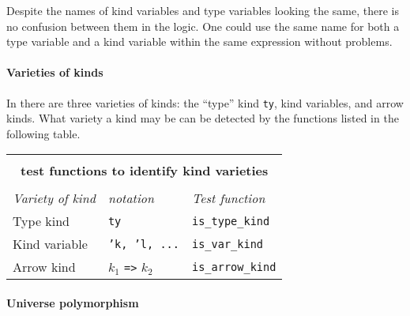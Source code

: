Despite the names of kind variables and type variables looking the same,
there is no confusion between them in the \HOLW{} logic.
One could use the same name for both a type variable
and a kind variable within the same expression without problems.

\paragraph{Varieties of kinds}

In \HOLW{} there are three varieties of kinds: the ``type'' kind \texttt{ty},
kind variables, and arrow kinds.
What variety a kind may be can be detected by the
\ML{} functions listed in the following table.

\begin{center}
\begin{tabular}{|l|l|l|} \hline
\multicolumn{3}{|c|}{ } \\
\multicolumn{3}{|c|}{\bf \ML{} test functions to identify kind varieties} \\
\multicolumn{3}{|c|}{ } \\
{\it Variety of kind} &
{\it \HOL{${}_\omega$} notation} &
{\it Test function} \\ \hline
Type kind & \texttt{ty} & \texttt{is\_type\_kind} \\ \hline
Kind variable & \texttt{'k, 'l, ...} & \texttt{is\_var\_kind} \\ \hline
Arrow kind & $k_{1}$ \texttt{=>} $k_{2}$ &
\texttt{is\_arrow\_kind} \\ \hline
\end{tabular}
\end{center}\label{kind-tests-table}


\paragraph{Universe polymorphism}

